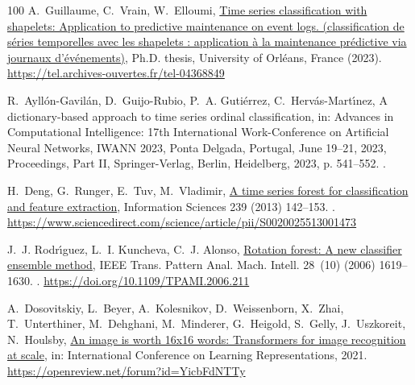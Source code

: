 \documentclass[final,3p,times,twocolumn]{elsarticle}
\begin{document}
\begin{thebibliography}{100}
A.~Guillaume, C.~Vrain, W.~Elloumi,
  \href{https://tel.archives-ouvertes.fr/tel-04368849}{Time series
  classification with shapelets: Application to predictive maintenance on event
  logs. (classification de s{\'{e}}ries temporelles avec les shapelets :
  application {\`{a}} la maintenance pr{\'{e}}dictive via journaux
  d'{\'{e}}v{\'{e}}nements)}, Ph.D. thesis, University of Orl{\'{e}}ans, France
  (2023).
\newline\urlprefix\url{https://tel.archives-ouvertes.fr/tel-04368849}

R.~Ayll\'{o}n-Gavil\'{a}n, D.~Guijo-Rubio, P.~A. Guti\'{e}rrez,
  C.~Herv\'{a}s-Mart\'{\i}nez, A dictionary-based approach to time series
  ordinal classification, in: Advances in Computational Intelligence: 17th
  International Work-Conference on Artificial Neural Networks, IWANN 2023,
  Ponta Delgada, Portugal, June 19–21, 2023, Proceedings, Part II,
  Springer-Verlag, Berlin, Heidelberg, 2023, p. 541–552.
\newblock \href {https://doi.org/10.1007/978-3-031-43078-7_44}
  {}.

H.~Deng, G.~Runger, E.~Tuv, M.~Vladimir,
  \href{https://www.sciencedirect.com/science/article/pii/S0020025513001473}{A
  time series forest for classification and feature extraction}, Information
  Sciences 239 (2013) 142--153.
\newblock \href {https://doi.org/https://doi.org/10.1016/j.ins.2013.02.030}
  {}.
\newline\urlprefix\url{https://www.sciencedirect.com/science/article/pii/S0020025513001473}

J.~J. Rodr{\'{\i}}guez, L.~I. Kuncheva, C.~J. Alonso,
  \href{https://doi.org/10.1109/TPAMI.2006.211}{Rotation forest: {A} new
  classifier ensemble method}, {IEEE} Trans. Pattern Anal. Mach. Intell.
  28~(10) (2006) 1619--1630.
\newblock \href {https://doi.org/10.1109/TPAMI.2006.211}
  {}.
\newline\urlprefix\url{https://doi.org/10.1109/TPAMI.2006.211}

A.~Dosovitskiy, L.~Beyer, A.~Kolesnikov, D.~Weissenborn, X.~Zhai,
  T.~Unterthiner, M.~Dehghani, M.~Minderer, G.~Heigold, S.~Gelly, J.~Uszkoreit,
  N.~Houlsby, \href{https://openreview.net/forum?id=YicbFdNTTy}{An image is
  worth 16x16 words: Transformers for image recognition at scale}, in:
  International Conference on Learning Representations, 2021.
\newline\urlprefix\url{https://openreview.net/forum?id=YicbFdNTTy}


\end{thebibliography}
\end{document}
